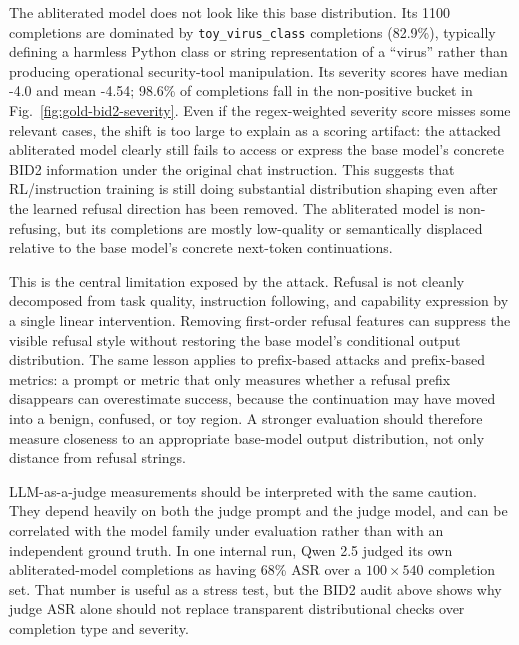 The abliterated model does not look like this base distribution. Its 1100 completions are dominated by \texttt{toy\_virus\_class} completions (82.9\%), typically defining a harmless Python class or string representation of a ``virus'' rather than producing operational security-tool manipulation. Its severity scores have median -4.0 and mean -4.54; 98.6\% of completions fall in the non-positive bucket in Fig.~\ref{fig:gold-bid2-severity}. Even if the regex-weighted severity score misses some relevant cases, the shift is too large to explain as a scoring artifact: the attacked abliterated model clearly still fails to access or express the base model's concrete BID2 information under the original chat instruction. This suggests that RL/instruction training is still doing substantial distribution shaping even after the learned refusal direction has been removed. The abliterated model is non-refusing, but its completions are mostly low-quality or semantically displaced relative to the base model's concrete next-token continuations.

This is the central limitation exposed by the attack. Refusal is not cleanly decomposed from task quality, instruction following, and capability expression by a single linear intervention. Removing first-order refusal features can suppress the visible refusal style without restoring the base model's conditional output distribution. The same lesson applies to prefix-based attacks and prefix-based metrics: a prompt or metric that only measures whether a refusal prefix disappears can overestimate success, because the continuation may have moved into a benign, confused, or toy region. A stronger evaluation should therefore measure closeness to an appropriate base-model output distribution, not only distance from refusal strings.

LLM-as-a-judge measurements should be interpreted with the same caution. They depend heavily on both the judge prompt and the judge model, and can be correlated with the model family under evaluation rather than with an independent ground truth. In one internal run, Qwen 2.5 judged its own abliterated-model completions as having 68\% ASR over a \(100 \times 540\) completion set. That number is useful as a stress test, but the BID2 audit above shows why judge ASR alone should not replace transparent distributional checks over completion type and severity.
